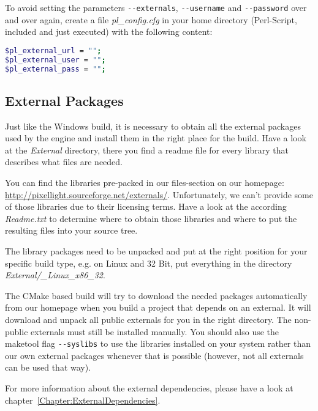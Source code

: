 To avoid setting the parameters \verb+--externals+, \verb+--username+ and \verb+--password+ over and over again, create a file \emph{pl\_config.cfg} in your home directory (Perl-Script, included and just executed) with the following content:
\begin{lstlisting}[language=sh]
$pl_external_url = "";
$pl_external_user = "";
$pl_external_pass = "";
\end{lstlisting}



\subsection{External Packages}
Just like the Windows build, it is necessary to obtain all the external packages used by the engine and install them in the right place for the build. Have a look at the \emph{External} directory, there you find a readme file for every library that describes what files are needed.

You can find the libraries pre-packed in our files-section on our homepage: \url{http://pixellight.sourceforge.net/externals/}. Unfortunately, we can't provide some of those libraries due to their licensing terms. Have a look at the according \emph{Readme.txt} to determine where to obtain those libraries and where to put the resulting files into your source tree.

The library packages need to be unpacked and put at the right position for your specific build type, e.g. on Linux and 32 Bit, put everything in the directory \emph{External/\_Linux\_x86\_32}.

The CMake based build will try to download the needed packages automatically from our homepage when you build a project that depends on an external. It will download and unpack all public externals for you in the right directory. The non-public externals must still be installed manually. You should also use the maketool flag \verb+--syslibs+ to use the libraries installed on your system rather than our own external packages whenever that is possible (however, not all externals can be used that way).

For more information about the external dependencies, please have a look at chapter~\ref{Chapter:ExternalDependencies}.




